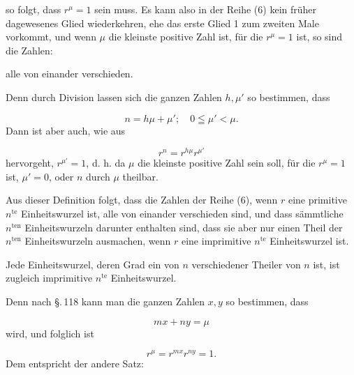 so folgt, dass $r^\mu = 1$ sein muss. Es kann also in der Reihe (6) kein früher
dagewesenes Glied wiederkehren, ehe das erste Glied 1 zum zweiten Male vorkommt, und
wenn $\mu$ die kleinste positive Zahl ist, für die $r^\mu = 1$ ist, so sind die Zahlen:

alle von einander verschieden.

 Denn durch Division lassen sich die ganzen
Zahlen $h, \mu'$ so bestimmen, dass

\[
n = h\mu + \mu'; \quad 0 \leqq \mu' < \mu.
\]
Dann ist aber auch, wie aus

\[
r^n = r^{h\mu} r^{\mu'}
\]
hervorgeht, $r^{\mu'} = 1$, d. h. da $\mu$ die kleinste positive Zahl sein soll, für die
$r^\mu = 1$ ist, $\mu' = 0$, oder $n$ durch $\mu$ theilbar.



Aus dieser Definition folgt, dass die Zahlen der Reihe (6), wenn $r$ eine primitive
$n^{\mathrm{te}}$ Einheitswurzel ist, alle von einander verschieden sind, und dass
sämmtliche $n^{\mathrm{ten}}$ Einheitswurzeln darunter enthalten sind, dass sie aber nur
einen Theil der $n^{\mathrm{ten}}$ Einheitswurzeln ausmachen, wenn $r$ eine imprimitive
$n^{\mathrm{te}}$ Einheitswurzel ist.

Jede Einheitswurzel, deren Grad ein von $n$ verschiedener Theiler von $n$ ist, ist
zugleich imprimitive $n^{\mathrm{te}}$ Einheitswurzel.


Denn nach \S.\,118 kann man die ganzen Zahlen $x, y$ so bestimmen, dass

\[
m x + n y = \mu
\]
wird, und folglich ist

\[
r^\mu = r^{mx} r^{ny} = 1.
\]
Dem entspricht der andere Satz:

